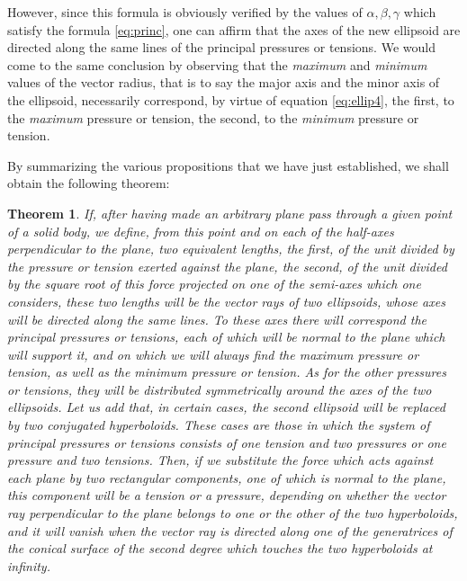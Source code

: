 \documentclass[leqno,openright,smallroyalvopaper,8pt,twoside,showtrims]{memoir}
\newtheorem{thm}{Theorem}
\begin{document}
\noindent However, since this formula is obviously verified by the values of $\alpha,\beta,\gamma$ which satisfy the formula \eqref{eq:princ}, one can affirm that the axes of the new ellipsoid are directed along the same lines of the principal pressures or tensions. We would come to the same conclusion by observing that the \emph{maximum} and \emph{minimum} values of the vector radius, that is to say the major axis and the minor axis of the ellipsoid, necessarily correspond, by virtue of equation \eqref{eq:ellip4}, the first, to the \emph{maximum} pressure or tension, the second, to the \emph{minimum} pressure or tension.

By summarizing the various propositions that we have just established, we shall obtain the following theorem:
\begin{thm}
If, after having made an arbitrary plane pass through a given point of a solid body, we define, from this point and on each of the half-axes perpendicular to the plane, two equivalent lengths, the first, of the unit divided by the pressure or tension exerted against the plane, the second, of the unit divided by the square root of this force projected on one of the semi-axes which one considers, these two lengths will be the vector rays of two ellipsoids, whose axes will be directed along the same lines. To these axes there will correspond the principal pressures or tensions, each of which will be normal to the plane which will support it, and on which we will always find the \emph{maximum} pressure or tension, as well as the \emph{minimum} pressure or tension. As for the other pressures or tensions, they will be distributed symmetrically around the axes of the two ellipsoids. Let us add that, in certain cases, the second ellipsoid will be replaced by two conjugated hyperboloids. These cases are those in which the system of principal pressures or tensions consists of one tension and two pressures or one pressure and two tensions. Then, if we substitute the force which acts against each plane by two rectangular components, one of which is normal to the plane, this component will be a tension or a pressure, depending on whether the vector ray perpendicular to the plane belongs to one or the other of the two hyperboloids,
and it will vanish when the vector ray is directed along one of the generatrices of the conical surface of the second degree which touches the two hyperboloids at infinity.
\end{thm} 
\end{document}

